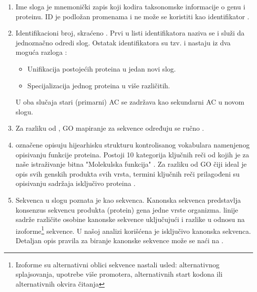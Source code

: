 \begin{enumerate}
  \item Ime sloga   je mnemonički zapis koji kodira
    taksonomske informacije o genu i proteinu. ID je podložan promenama 
    i ne može se koristiti kao identifikator \parencite{www_uniprot}.
  \item Identifikacioni broj, skraćeno  .
    Prvi u listi identifikatora naziva se  i služi da
    jednoznačno odredi slog. Ostatak identifikatora su tzv.  i
    nastaju iz dva moguća razloga \parencite{svisprot2003, www_uniprot}:
    \begin{itemize}
      \item Unifikacija postojećih proteina u jedan novi slog. 
      \item Specijalizacija jednog proteina u više različitih.
    \end{itemize}
    U oba slučaja stari (primarni) AC se zadržava kao sekundarni AC u novom slogu.

  \item Za razliku od \trembl, GO mapiranje za \swissprot sekvence određuju se ručno \parencite{www_uniprot}.

  \item {}  označene  opisuju
    hijearhisku strukturu kontrolisanog vokabulara namenjenog opisivanju
    funkcije proteina. Postoji 10 kategorija ključnih reči od kojih je za naše
    istraživanje bitna "Molekulska funkcija"  \parencite{svisprot2003}.  Za
    razliku od GO čiji ideal je opis svih genskih produkta svih vrsta, termini
    ključnih reči prilagođeni su opisivanju sadržaja isključivo \swissprot
    proteina \parencite{www_uniprot}.

  \item Sekvenca  u slogu poznata je kao 
     sekvenca. Kanonska sekvenca predstavlja konsenzus sekvencu
    produkta (protein) gena jedne vrste organizma.   linije sadrže
    različite osobine kanonske sekvence uključujući i razlike u odnosu na
    izoforme\footnote{Izoforme su alternativni oblici sekvence nastali usled:
    alternativnog splajsovanja, upotrebe više promotera, alternativnih start
  kodona ili alternativnih okvira čitanja } sekvence.  U našoj analizi
  korišćena je isključivo kanonska sekvenca. Detaljan opis pravila za biranje
  kanonske sekvence može se naći na \cite{www_uniprot}.


\end{enumerate}
